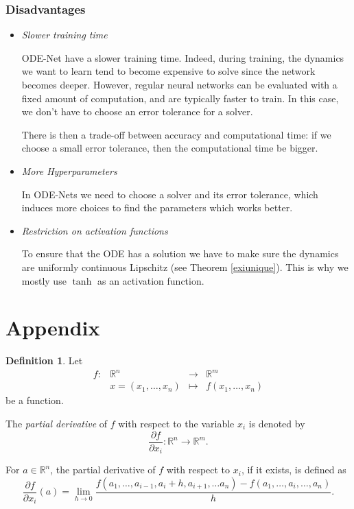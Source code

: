 \documentclass[10pt,a4paper]{article}
\theoremstyle{definition}
\newtheorem{definition}{Definition}
\theoremstyle{plain}
\begin{document}
\subsubsection*{Disadvantages}
\begin{itemize}
\item \textit{Slower training time}

ODE-Net have a slower training time. Indeed, during training, the dynamics we want to learn tend to become expensive to solve since the network becomes deeper. However, regular neural networks can be evaluated with a fixed amount of computation, and are typically faster to train. In this case, we don't have to choose an error tolerance for a solver.

There is then a trade-off between accuracy and computational time: if we choose a small error tolerance, then the computational time be bigger.

\item \textit{More Hyperparameters}

In ODE-Nets we need to choose a solver and its error tolerance, which induces more choices to find the parameters which works better.

\item \textit{Restriction on activation functions}

To ensure that the ODE has a solution we have to make sure the dynamics are uniformly continuous Lipschitz (see Theorem \ref{exiunique}). This is why we mostly use $\tanh$ as an activation function.
\end{itemize}

\newpage

\section{Appendix}\label{annex}

\begin{definition}
Let   $$\begin{array}{rclc}
f: & \mathbb{R}^n & \rightarrow &  \mathbb{R}^m \\
&x = (x_1, \dots, x_n) & \mapsto & f(x_1, \dots, x_n)
\end{array}$$ be a function.

The \textit{partial derivative} of $f$ with respect to the variable $x_i$ is denoted by
$$
\frac{\partial f}{\partial x_i} :\mathbb{R}^n \rightarrow \mathbb{R}^m.
$$

For $a\in \mathbb{R}^n$, the partial derivative of $f$ with respect to $x_i$, if it exists, is defined as
$$
\frac{\partial f}{\partial x_i}(a) = \lim_{h\rightarrow0}\frac{f(a_1,\dots , a_{i-1}, a_i + h, a_{i+1}, \dots a_n) - f(a_1,\dots, a_i,\dots, a_n)}{h}.
$$
\end{definition}
\end{document}
